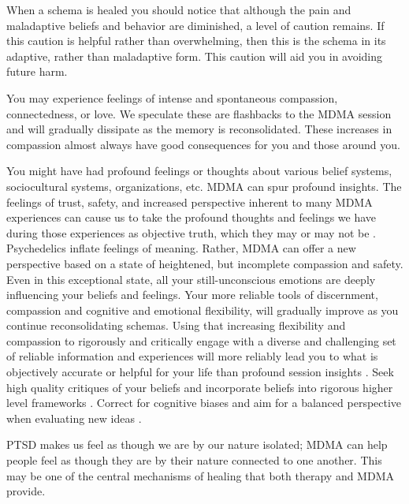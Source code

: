 \documentclass[12pt,letterpaper]{article}
\begin{document}
When a schema is healed you should notice that although the pain and maladaptive beliefs and behavior are diminished, a level of caution remains. If this caution is helpful rather than overwhelming, then this is the schema in its adaptive, rather than maladaptive form. This caution will aid you in avoiding future harm.

You may experience feelings of intense and spontaneous compassion, connectedness, or love. We speculate these are flashbacks to the MDMA session and will gradually dissipate as the memory is reconsolidated. These increases in compassion almost always have good consequences for you and those around you.

You might have had profound feelings or thoughts about various belief systems, sociocultural systems, organizations, etc. MDMA can spur profound insights. The feelings of trust, safety, and increased perspective inherent to many MDMA experiences can cause us to take the profound thoughts and feelings we have during those experiences as objective truth, which they may or may not be \cite{hartogsohn2018meaning}. Psychedelics inflate feelings of meaning. Rather, MDMA can offer a new perspective based on a state of heightened, but incomplete compassion and safety. Even in this exceptional state, all your still-unconscious emotions are deeply influencing your beliefs and feelings. Your more reliable tools of discernment, compassion and cognitive and emotional flexibility, will gradually improve as you continue reconsolidating schemas. Using that increasing flexibility and compassion to rigorously and critically engage with a diverse and challenging set of reliable information and experiences will more reliably lead you to what is objectively accurate or helpful for your life than profound session insights \cite{bentzMindfulInquiry}. Seek high quality critiques of your beliefs and incorporate beliefs into rigorous higher level frameworks \cite{saganDemon}. Correct for cognitive biases and aim for a balanced perspective when evaluating new ideas \cite{galefScoutMindset}.

PTSD makes us feel as though we are by our nature isolated; MDMA can help people feel as though they are by their nature connected to one another. This may be one of the central mechanisms of healing that both therapy and MDMA provide.
\end{document}
